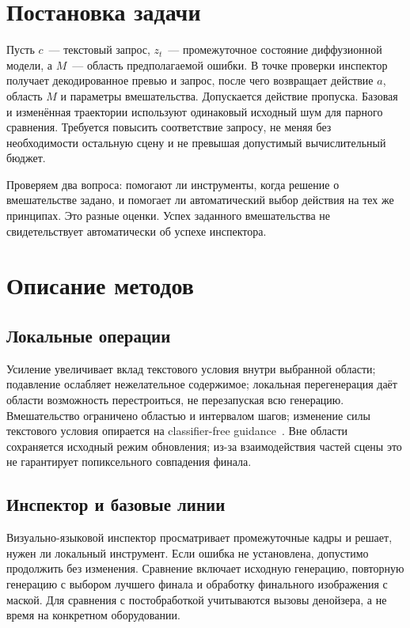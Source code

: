 \documentclass{misisarticle}
\begin{document}
\section{Постановка задачи}
Пусть \(c\)~--- текстовый запрос, \(z_t\)~--- промежуточное состояние диффузионной модели, а \(M\)~--- область предполагаемой ошибки. В точке проверки инспектор получает декодированное превью и запрос, после чего возвращает действие \(a\), область \(M\) и параметры вмешательства. Допускается действие пропуска. Базовая и изменённая траектории используют одинаковый исходный шум для парного сравнения. Требуется повысить соответствие запросу, не меняя без необходимости остальную сцену и не превышая допустимый вычислительный бюджет.

Проверяем два вопроса: помогают ли инструменты, когда решение о вмешательстве задано, и помогает ли автоматический выбор действия на тех же принципах. Это разные оценки. Успех заданного вмешательства не свидетельствует автоматически об успехе инспектора.

\section{Описание методов}
\subsection{Локальные операции}
Усиление увеличивает вклад текстового условия внутри выбранной области; подавление ослабляет нежелательное содержимое; локальная перегенерация даёт области возможность перестроиться, не перезапуская всю генерацию. Вмешательство ограничено областью и интервалом шагов; изменение силы текстового условия опирается на classifier-free guidance~\cite{cfg}. Вне области сохраняется исходный режим обновления; из-за взаимодействия частей сцены это не гарантирует попиксельного совпадения финала.

\subsection{Инспектор и базовые линии}
Визуально-языковой инспектор просматривает промежуточные кадры и решает, нужен ли локальный инструмент. Если ошибка не установлена, допустимо продолжить без изменения. Сравнение включает исходную генерацию, повторную генерацию с выбором лучшего финала и обработку финального изображения с маской. Для сравнения с постобработкой учитываются вызовы денойзера, а не время на конкретном оборудовании.
\end{document}
